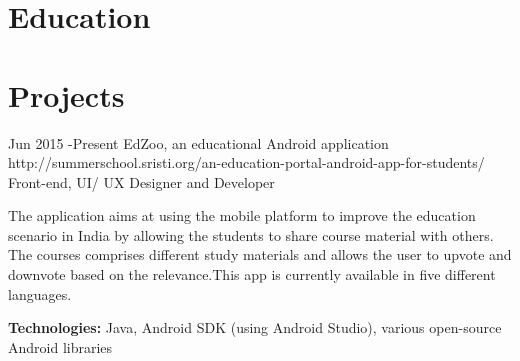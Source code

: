 \documentclass[10pt]{article} %
\begin{document}

\section{Education}






\section{Projects}

\job
{Jun 2015 -}{Present}
{\color{slateblue} EdZoo, an educational Android application }
{http://summerschool.sristi.org/an-education-portal-android-app-for-students/}
{Front-end, UI/ UX Designer and Developer}
{The application aims at using the mobile platform to improve the education scenario in India by allowing the students to share course material with others. The courses comprises different study materials and allows the user to upvote and downvote based on the relevance.This app is currently available in five different languages.\\
\rule{0mm}{5mm}\textbf{Technologies:} Java, Android SDK (using Android Studio), various open-source Android libraries }

\end{document}
